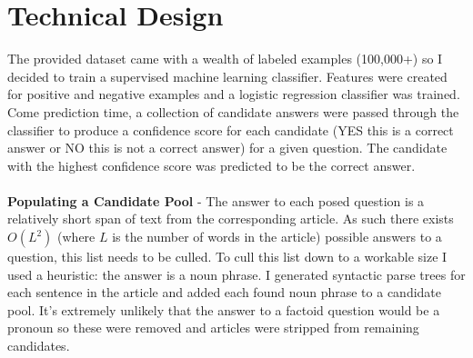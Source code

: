 \documentclass[a4paper, 11pt]{article} %
\begin{document}
\section*{Technical Design}
The provided dataset came with a wealth of labeled examples (100,000+) so I decided to train a supervised machine learning classifier. Features were created for positive and negative examples and a logistic regression classifier was trained. Come prediction time, a collection of candidate answers were passed through the classifier to produce a confidence score for each candidate (YES this is a correct answer or NO this is not a correct answer) for a given question. The candidate with the highest confidence score was predicted to be the correct answer.
\\~\\
\textbf{Populating a Candidate Pool} - The answer to each posed question is a relatively short span of text from the corresponding article. As such there exists $O(L^2)$ (where $L$ is the number of words in the article) possible answers to a question, this list needs to be culled. To cull this list down to a workable size I used a heuristic: the answer is a noun phrase. I generated syntactic parse trees for each sentence in the article and added each found noun phrase to a candidate pool. It's extremely unlikely that the answer to a factoid question would be a pronoun so these were removed and articles were stripped from remaining candidates.
\end{document}
